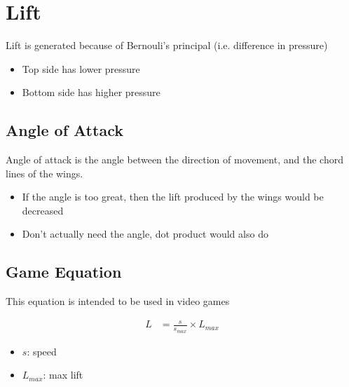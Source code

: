 \section{Lift}

Lift is generated because of Bernouli's principal (i.e. difference in pressure)

\begin{itemize}
  \item Top side has lower pressure
  \item Bottom side has higher pressure
\end{itemize}

\subsection{Angle of Attack}

  Angle of attack is the angle between the direction of movement, and the
  chord lines of the wings.

  \begin{itemize}
    \item If the angle is too great, then the lift produced by the wings
    would be decreased
    \item Don't actually need the angle, dot product would also do
  \end{itemize}

\subsection{Game Equation}

  This equation is intended to be used in video games

  \begin{align}
    L &= \frac{s}{s_{max}} \times L_{max}
  \end{align}

  \begin{itemize}
    \item $ s $: speed
    \item $ L_{max} $: max lift
  \end{itemize}
